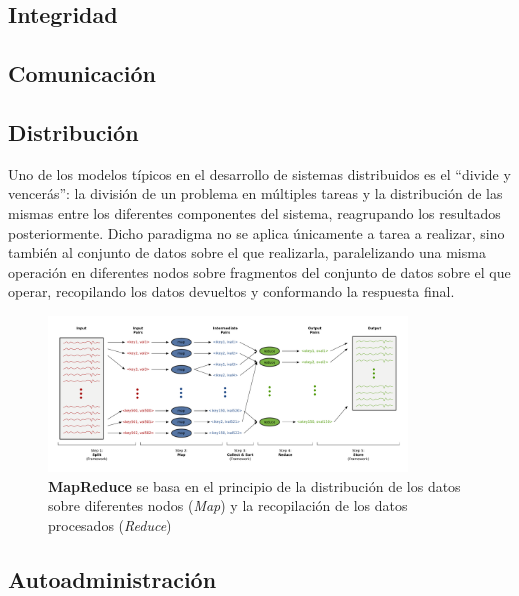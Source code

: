 \subsection{Integridad}

\subsection{Comunicación}

\subsection{Distribución}

Uno de los modelos típicos en el desarrollo de sistemas distribuidos es el ``divide y vencerás'': la división de un problema en múltiples tareas y la distribución de las mismas entre los diferentes componentes del sistema, reagrupando los resultados posteriormente. Dicho paradigma no se aplica únicamente a tarea a realizar, sino también al conjunto de datos sobre el que realizarla, paralelizando una misma operación en diferentes nodos sobre fragmentos del conjunto de datos sobre el que operar, recopilando los datos devueltos y conformando la respuesta final.


\begin{figure}[H]
  \centering
  \includegraphics[width=0.85\textwidth]{Chapter2/Figures/map-reduce}
  \caption[MapReduce]{\textbf{MapReduce} se basa en el principio de la distribución de los datos sobre diferentes nodos (\textit{Map}) y la recopilación de los datos procesados (\textit{Reduce})}
  \label{fig:mapreduce}
\end{figure}

\subsection{Autoadministración}
\label{teoria:autoadministracion}

